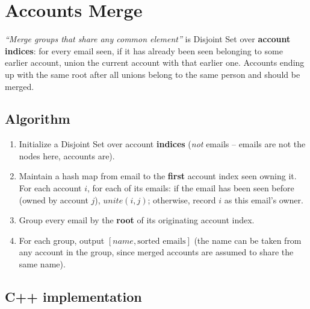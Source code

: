 \section{Accounts Merge}
\label{sec:graph-accounts-merge}


\begin{patternbox}
\emph{``Merge groups that share any common element''} is Disjoint Set
over \textbf{account indices}: for every email seen, if it has already
been seen belonging to some earlier account, union the current account
with that earlier one. Accounts ending up with the same root after all
unions belong to the same person and should be merged.
\end{patternbox}

\subsection*{Algorithm}

\begin{enumerate}
  \item Initialize a Disjoint Set over account \textbf{indices}
        (\emph{not} emails -- emails are not the nodes here, accounts
        are).
  \item Maintain a hash map from email to the \textbf{first} account
        index seen owning it. For each account $i$, for each of its
        emails: if the email has been seen before (owned by account
        $j$), $\textit{unite}(i,j)$; otherwise, record $i$ as this
        email's owner.
  \item Group every email by the \textbf{root} of its originating
        account index.
  \item For each group, output $[\textit{name}, \text{sorted emails}]$
        (the name can be taken from any account in the group, since
        merged accounts are assumed to share the same name).
\end{enumerate}

\subsection*{C++ implementation}

